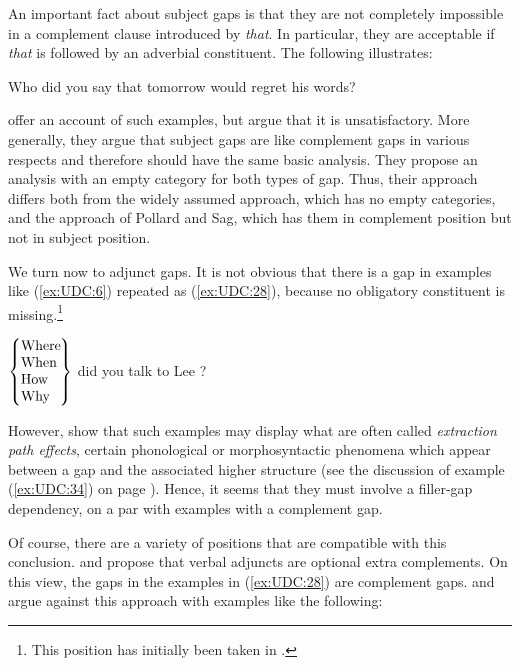 \documentclass[output=paper
,notxmath 
	        ,collection
	        ,collectionchapter
 	        ,biblatex
                ,babelshorthands
                ,newtxmath
                ,draftmode
                ,colorlinks, citecolor=brown
]{langscibook}
\begin{document}
An important fact about subject gaps is that they are not completely
impossible in a complement clause introduced by \emph{that}. In
particular, they are acceptable if \emph{that} is followed by an
adverbial constituent. The following illustrates:

\begin{exe}
\ex \label{ex:UDC:27}
Who did you say that tomorrow \trace{} would regret his words?
\end{exe}

\noindent
\citet[Chapter~5.1.3]{Ginzburg:Sag:01} offer an account of such examples, but
\citet[Chapter~2.3.2]{Levine:Hukari:06} argue that it is unsatisfactory. More generally, they
argue that subject gaps are like complement gaps in various respects
and therefore should have the same basic analysis. They propose an
analysis with an empty category for both types of gap. Thus, their
approach differs both from the widely assumed approach, which has no
empty categories, and the approach of Pollard and Sag, which has them
in complement position but not in subject position.\label{udc:page-subject-gaps-end}

We turn now to adjunct gaps. It is not obvious that there is a gap in
examples like (\ref{ex:UDC:6}) repeated as (\ref{ex:UDC:28}), because
no obligatory constituent is missing.\footnote{This position has initially
  been taken in \citet[176--180]{Pollard:Sag:94}. } 

\ea
\label{ex:UDC:28}
$\begin{array}{@{}l@{}}
\left\{%
\begin{tabular}{@{}l@{}}
  Where\hspace{-.09em}\mbox{}\\
  When\\
  How\\
  Why\\
\end{tabular}\right\}
\end{array}$
did you talk to Lee \trace{}?
\z

\noindent
However, \cite{hukari.levine:adjunct} show that such examples may display
what are often called \emph{extraction path effects}, certain phonological or
morphosyntactic phenomena which appear between a gap and the associated
higher structure (see the discussion of example (\ref{ex:UDC:34}) on
page \pageref{ex:UDC:34}). Hence, it seems that they must
involve a filler-gap dependency, on a par with examples with a
complement gap.

Of course, there are a variety of positions that are compatible with
this conclusion. \citet[]{Bouma:Malouf:Sag:01} and \citet[168,
fn.~2]{Ginzburg:Sag:01} propose that verbal adjuncts are optional
extra complements.  On this view, the gaps in the examples in
(\ref{ex:UDC:28}) are complement gaps.  \citet{Levine:03} and
\citet[Chapter~3.5--3.6]{Levine:Hukari:06} argue against this approach with examples
like the following:
\end{document}
